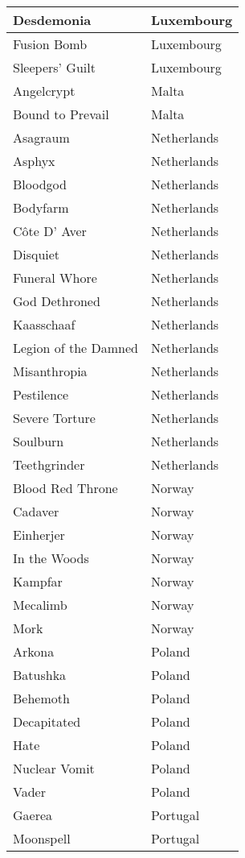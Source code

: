 \documentclass[12pt, a4paper, twoside]{report}
\begin{document}
\begin{center}
\begin{longtable}{|p{5cm}|p{5cm}|}
Desdemonia & Luxembourg \\ \hline
Fusion Bomb & Luxembourg \\ \hline
Sleepers' Guilt & Luxembourg \\ \hline
Angelcrypt & Malta \\ \hline
Bound to Prevail & Malta \\ \hline
Asagraum & Netherlands \\ \hline
Asphyx & Netherlands \\ \hline
Bloodgod & Netherlands \\ \hline
Bodyfarm & Netherlands \\ \hline
Côte D' Aver & Netherlands \\ \hline
Disquiet & Netherlands \\ \hline
Funeral Whore & Netherlands \\ \hline
God Dethroned & Netherlands \\ \hline
Kaasschaaf & Netherlands \\ \hline
Legion of the Damned & Netherlands \\ \hline
Misanthropia & Netherlands \\ \hline
Pestilence & Netherlands \\ \hline
Severe Torture & Netherlands \\ \hline
Soulburn & Netherlands \\ \hline
Teethgrinder & Netherlands \\ \hline
Blood Red Throne & Norway \\ \hline
Cadaver & Norway \\ \hline
Einherjer & Norway \\ \hline
In the Woods & Norway \\ \hline
Kampfar & Norway \\ \hline
Mecalimb & Norway \\ \hline
Mork & Norway \\ \hline
Arkona & Poland \\ \hline
Batushka & Poland \\ \hline
Behemoth & Poland \\ \hline
Decapitated & Poland \\ \hline
Hate & Poland \\ \hline
Nuclear Vomit & Poland \\ \hline
Vader & Poland \\ \hline
Gaerea & Portugal \\ \hline
Moonspell & Portugal \\ \hline

\end{longtable}
\end{center}
\end{document}
